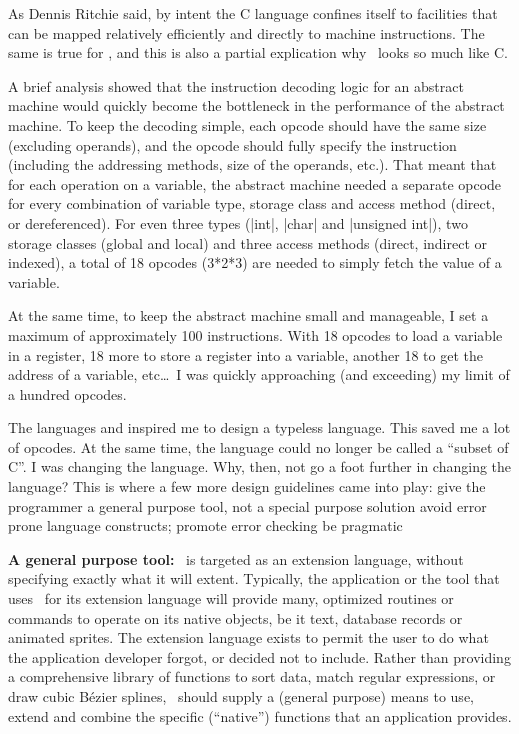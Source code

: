 {{
As Dennis Ritchie said, by intent the C language confines itself to facilities
that can be mapped relatively efficiently and directly to machine
instructions. The same is true for \Small, and this is also a partial
explication why \Small\ looks so much like C.

A brief analysis showed that the instruction decoding logic for an abstract
machine would quickly become the bottleneck in the performance of the abstract
machine. To keep the decoding simple, each opcode should have the same size
(excluding operands), and the opcode should fully specify the instruction
(including the addressing methods, size of the operands, etc.). That meant
that for each operation on a variable, the abstract machine needed a separate
opcode for every combination of variable type, storage class and access method
(direct, or dereferenced). For even three types (|int|, |char| and |unsigned int|),
two storage classes (global and local) and three access methods (direct,
indirect or indexed), a total of 18 opcodes (3*2*3) are needed to simply fetch
the value of a variable.

At the same time, to keep the abstract machine small and manageable, I set a
maximum of approximately 100 instructions. With 18 opcodes to
load a variable in a register, 18 more to store a register into a variable,
another 18 to get the address of a variable, etc\dots\ I was quickly approaching
(and exceeding) my limit of a hundred opcodes.

 
The languages  and  inspired me to design a
typeless language. This saved me a lot of opcodes. At the same time, the
language could no longer be called a ``subset of C''. I was changing the
language. Why, then, not go a foot further in changing the language? This is
where a few more design guidelines came into play:
\beginlist{1em}\compactlist
\list{\lbullet} give the programmer a general purpose tool, not a special
  purpose solution
\list{\lbullet} avoid error prone language constructs; promote error checking
\list{\lbullet} be pragmatic
\endlist

{\bf A general purpose tool:} \Small\ is targeted as an extension language,
without specifying exactly what it will extent. Typically, the application or
the tool that uses \Small\ for its extension language will provide many,
optimized routines or commands to operate on its native objects, be it text,
database records or animated sprites. The extension language exists to permit
the user to do what the application developer forgot, or decided not to include. Rather
than providing a comprehensive library of functions to sort data, match
regular expressions, or draw cubic B\'ezier splines, \Small\ should supply a
(general purpose) means to use, extend and combine the specific (``native'')
functions that an application provides.

}}
